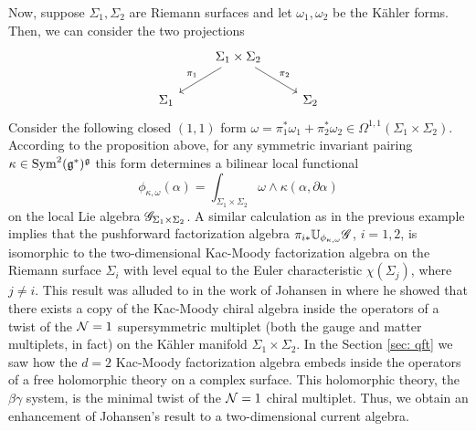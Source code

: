 Now, suppose $\Sigma_1,\Sigma_2$ are Riemann surfaces and let $\omega_1,\omega_2$ be the K\"{a}hler forms. 
Then, we can consider the two projections
\[
\begin{tikzcd}
& \Sigma_1 \times \Sigma_2 \arrow[dl,"\pi_1"'] \arrow[dr,"\pi_2"] & \\
\Sigma_1 & & \Sigma_2
\end{tikzcd}
\]
Consider the following closed $(1,1)$ form $\omega = \pi_1^* \omega_1 + \pi_2^* \omega_2 \in \Omega^{1,1}(\Sigma_1 \times \Sigma_2)$. 
According to the proposition above, for any symmetric invariant pairing $\kappa \in {\rm Sym}^2 (\mathfrak g^*)^\mathfrak g$ this form determines a bilinear local functional
\[
\phi_{\kappa,\omega}(\alpha) = \int_{\Sigma_1 \times \Sigma_2} \omega \wedge \kappa(\alpha, \partial \alpha) 
\]
on the local Lie algebra $\mathscr G_{\Sigma_1\times \Sigma_2}$.
A similar calculation as in the previous example implies that the pushforward factorization algebra $\pi_{i*}\mathbb U_{\phi_{\kappa, \omega}}\mathscr G$, $i=1,2$, is isomorphic to the two-dimensional Kac-Moody factorization algebra on the Riemann surface $\Sigma_i$ with level equal to the Euler characteristic $\chi(\Sigma_j)$, where $j \ne i$. 
This result was alluded to in the work of Johansen in \cite{JohansenKM} where he showed that there exists a copy of the Kac-Moody chiral algebra inside the operators of a twist of the $\mathcal N=1$ supersymmetric multiplet (both the gauge and matter multiplets, in fact) on the K\"{a}hler manifold $\Sigma_1 \times \Sigma_2$. 
In the Section \ref{sec: qft} we saw how the $d = 2$ Kac-Moody factorization algebra embeds inside the operators of a free holomorphic theory on a complex surface. 
This holomorphic theory, the $\beta\gamma$ system, is the minimal twist of the $\mathcal N=1$ chiral multiplet.
Thus, we obtain an enhancement of Johansen's result to a two-dimensional current algebra.

